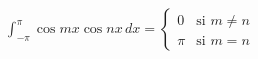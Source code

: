 \item $\displaystyle\int_{-\pi}^{\pi} \cos mx \cos nx \, dx = \begin{cases} 0 & \text{si } m \ne n \\ \pi & \text{si } m = n \end{cases}$
